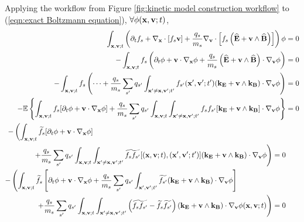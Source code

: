     Applying the workflow from Figure \ref{fig:kinetic model construction workflow} to (\ref{eqn:exact Boltzmann equation}), $\forall \phi(\mathbf{x}, \mathbf{v}; t)$,
    {\small \begin{align}
        \int_{\mathbf{x}, \mathbf{v}; t}\left(\partial_{t}f_{s} + \nabla_{\mathbf{x}}\cdot[f_{s}\mathbf{v}] + \frac{q_{s}}{m_{s}}\nabla_{\mathbf{v}}\cdot\left[f_{s}\left(\widehat{\mathbf{E}} + \mathbf{v}\wedge\widehat{\mathbf{B}}\right)\right]\right)\phi  &=  0  \\
        - \int_{\mathbf{x}, \mathbf{v}; t}f_{s}\left(\partial_{t}\phi + \mathbf{v}\cdot\nabla_{\mathbf{x}}\phi + \frac{q_{s}}{m_{s}}\left(\widehat{\mathbf{E}} + \mathbf{v}\wedge\widehat{\mathbf{B}}\right)\cdot\nabla_{\mathbf{v}}\phi\right)  &=  0  \\
        - \int_{\mathbf{x}, \mathbf{v}; t}f_{s}\left(\cdots + \frac{q_{s}}{m_{s}}\sum_{s'}q_{s'}\int_{\mathbf{x}' \neq \mathbf{x}, \mathbf{v}'; t'}f_{s'}(\mathbf{x}', \mathbf{v}'; t')(\mathbf{k}_{\mathbf{E}} + \mathbf{v}\wedge\mathbf{k}_{\mathbf{B}})\cdot\nabla_{\mathbf{v}}\phi\right)  &=  0  \\
        - \mathbb{E}\left\{\int_{\mathbf{x}, \mathbf{v}; t}f_{s}[\partial_{t}\phi + \mathbf{v}\cdot\nabla_{\mathbf{x}}\phi] + \frac{q_{s}}{m_{s}}\sum_{s'}q_{s'}\int_{\mathbf{x}, \mathbf{v}; t}\int_{\mathbf{x}' \neq \mathbf{x}, \mathbf{v}'; t'}f_{s}f_{s'}[\mathbf{k}_{\mathbf{E}}  + \mathbf{v}\wedge\mathbf{k}_{\mathbf{B}}]\cdot\nabla_{\mathbf{v}}\phi\right\}  &=  0  \\
        \begin{split}
            - \left(\int_{\mathbf{x}, \mathbf{v}; t}\widetilde{f_{s}}[\partial_{t}\phi + \mathbf{v}\cdot\nabla_{\mathbf{x}}\phi]\right.  \;\;\;\;\;\;\;\;\;\;\;\;\;\;\;\;\;\;\;\;\;\;\;\;\;\;\;\;\;\;\;\;\;\;\;\;\;\;\;\;\;\;\;\;\;\;\;\;\;\;\;\;\;\;\;\;\;\;\;\;\;\;\;\;\;\;\;\;\;\;\;\;\;\;\;\;\;\;\;\;\;\;\;\;\;\;\;\;&\;  \\
            \left.  + \frac{q_{s}}{m_{s}}\sum_{s'}q_{s'}\int_{\mathbf{x}, \mathbf{v}; t}\int_{\mathbf{x}' \neq \mathbf{x}, \mathbf{v}'; t'}\widetilde{f_{s}f_{s'}}[(\mathbf{x}, \mathbf{v}; t), (\mathbf{x}', \mathbf{v}'; t')](\mathbf{k}_{\mathbf{E}}  + \mathbf{v}\wedge\mathbf{k}_{\mathbf{B}})\cdot\nabla_{\mathbf{v}}\phi\right)  &=  0
        \end{split}  \\
        \begin{split}
            - \left(\int_{\mathbf{x}, \mathbf{v}; t}\widetilde{f_{s}}\left[\partial_{t}\phi + \mathbf{v}\cdot\nabla_{\mathbf{x}}\phi + \frac{q_{s}}{m_{s}}\sum_{s'}q_{s'}\int_{\mathbf{x}', \mathbf{v}'; t'}\widetilde{f_{s'}}(\mathbf{k}_{\mathbf{E}}  + \mathbf{v}\wedge\mathbf{k}_{\mathbf{B}})\cdot\nabla_{\mathbf{v}}\phi\right]\right.  \;\;\;\;\;\;\;\;\;\;\;\;\;\;\;\;\;&\;  \\
            \left.  + \frac{q_{s}}{m_{s}}\sum_{s'}q_{s'}\int_{\mathbf{x}, \mathbf{v}; t}\int_{\mathbf{x}' \neq \mathbf{x}, \mathbf{v}'; t'}\left(\widetilde{f_{s}f_{s'}} - \widetilde{f_{s}}\widetilde{f_{s'}}\right)(\mathbf{k}_{\mathbf{E}}  + \mathbf{v}\wedge\mathbf{k}_{\mathbf{B}})\cdot\nabla_{\mathbf{v}}\phi(\mathbf{x}, \mathbf{v}; t)\right)  &=  0
        \end{split}
    \end{align}}
